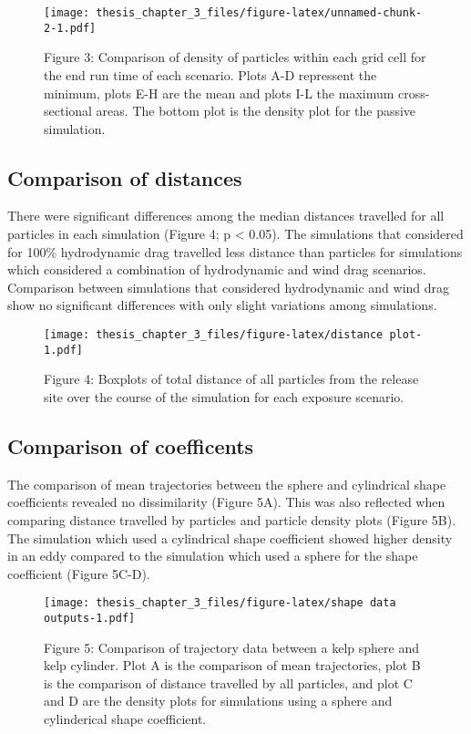 \documentclass[
]{article}
\begin{document}
\begin{figure}
\centering
\texttt{[image: thesis\_chapter\_3\_files/figure-latex/unnamed-chunk-2-1.pdf]}
\caption{Figure 3: Comparison of density of particles within each grid
cell for the end run time of each scenario. Plots A-D repressent the
minimum, plots E-H are the mean and plots I-L the maximum
cross-sectional areas. The bottom plot is the density plot for the
passive simulation.}
\end{figure}

\hypertarget{comparison-of-distances}{%
\subsection{Comparison of distances}\label{comparison-of-distances}}

There were significant differences among the median distances travelled
for all particles in each simulation (Figure 4; p \textless{} 0.05). The
simulations that considered for 100\% hydrodynamic drag travelled less
distance than particles for simulations which considered a combination
of hydrodynamic and wind drag scenarios. Comparison between simulations
that considered hydrodynamic and wind drag show no significant
differences with only slight variations among simulations.

\begin{figure}
\centering
\texttt{[image: thesis\_chapter\_3\_files/figure-latex/distance plot-1.pdf]}
\caption{Figure 4: Boxplots of total distance of all particles from the
release site over the course of the simulation for each exposure
scenario.}
\end{figure}

\hypertarget{comparison-of-coefficents}{%
\subsection{Comparison of coefficents}\label{comparison-of-coefficents}}

The comparison of mean trajectories between the sphere and cylindrical
shape coefficients revealed no dissimilarity (Figure 5A). This was also
reflected when comparing distance travelled by particles and particle
density plots (Figure 5B). The simulation which used a cylindrical shape
coefficient showed higher density in an eddy compared to the simulation
which used a sphere for the shape coefficient (Figure 5C-D).

\begin{figure}
\centering
\texttt{[image: thesis\_chapter\_3\_files/figure-latex/shape data outputs-1.pdf]}
\caption{Figure 5: Comparison of trajectory data between a kelp sphere
and kelp cylinder. Plot A is the comparison of mean trajectories, plot B
is the comparison of distance travelled by all particles, and plot C and
D are the density plots for simulations using a sphere and cylinderical
shape coefficient.}
\end{figure}
\end{document}
